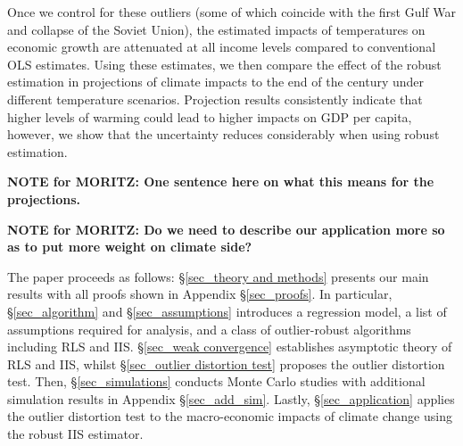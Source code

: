 \documentclass[11pt, letterpaper]{article}
\numberwithin{algorithm}{section}
\numberwithin{assumption}{section}
\numberwithin{lemma}{section}
\numberwithin{theorem}{section}
\numberwithin{corollary}{section}
\numberwithin{remark}{section}
\numberwithin{equation}{section}
\numberwithin{figure}{section}
\numberwithin{table}{section}
\begin{document}
Once we control for these outliers (some of which coincide with the first Gulf War and collapse of the Soviet Union), the estimated impacts of temperatures on economic growth are attenuated at all income levels compared to conventional OLS estimates. Using these estimates, we then compare the effect of the robust estimation in projections of climate impacts to the end of the century under different temperature scenarios. Projection results consistently indicate that higher levels of warming could lead to higher impacts on GDP per capita, however, we show that the uncertainty reduces considerably when using robust estimation.



\textbf{NOTE for MORITZ: One sentence here on what this means for the projections.}

\textbf{NOTE for MORITZ: Do we need to describe our application more so as to put more weight on climate side?}

The paper proceeds as follows: \S \ref{sec_theory and methods} presents our main results with all proofs shown in Appendix \S \ref{sec_proofs}. In particular, \S \ref{sec_algorithm} and \S \ref{sec_assumptions} introduces a regression model, a list of assumptions required for analysis, and a class of outlier-robust algorithms including RLS and IIS. \S \ref{sec_weak convergence} establishes asymptotic theory of RLS and IIS, whilst \S \ref{sec_outlier distortion test} proposes the outlier distortion test. Then, \S \ref{sec_simulations} conducts Monte Carlo studies with additional simulation results in Appendix \S \ref{sec_add_sim}. Lastly, \S \ref{sec_application} applies the outlier distortion test to the macro-economic impacts of climate change using the robust IIS estimator.
\end{document}
